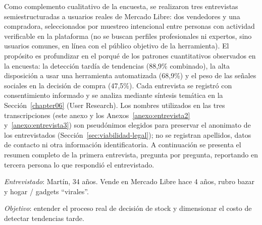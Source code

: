 \label{anexo:entrevista1}

Como complemento cualitativo de la encuesta, se realizaron tres entrevistas semiestructuradas a usuarios reales de Mercado Libre: dos vendedores y una compradora, seleccionados por muestreo intencional entre personas con actividad verificable en la plataforma (no se buscan perfiles profesionales ni expertos, sino usuarios comunes, en línea con el público objetivo de la herramienta). El propósito es profundizar en el porqué de los patrones cuantitativos observados en la encuesta: la detección tardía de tendencias (88,9\% combinado), la alta disposición a usar una herramienta automatizada (68,9\%) y el peso de las señales sociales en la decisión de compra (47,5\%). Cada entrevista se registró con consentimiento informado y se analiza mediante síntesis temática en la Sección~\ref{chapter06} (User Research). Los nombres utilizados en las tres transcripciones (este anexo y los Anexos~\ref{anexo:entrevista2} y~\ref{anexo:entrevista3}) son pseudónimos elegidos para preservar el anonimato de los entrevistados (Sección~\ref{sec:viabilidad-legal}); no se registran apellidos, datos de contacto ni otra información identificatoria. A continuación se presenta el resumen completo de la primera entrevista, pregunta por pregunta, reportando en tercera persona lo que respondió el entrevistado.

\emph{Entrevistado}: Martín, 34 años. Vende en Mercado Libre hace 4 años, rubro bazar y hogar / gadgets ``virales''.

\emph{Objetivo}: entender el proceso real de decisión de stock y dimensionar el costo de detectar tendencias tarde.

